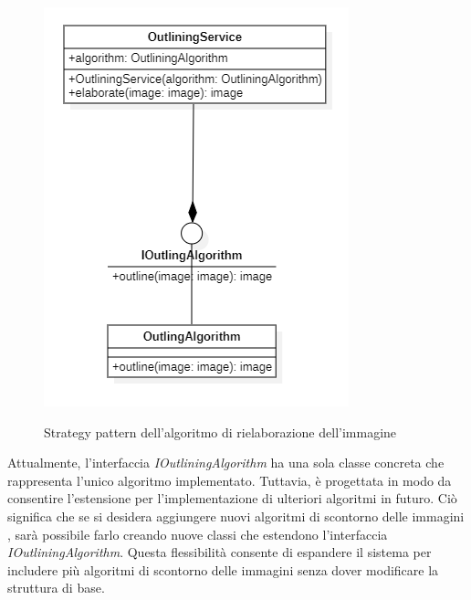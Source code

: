 \begin{figure}[H]
    \centering
    \includegraphics[scale = 0.8]{img/outlineStrategy.png}\\
    \caption{Strategy pattern dell'algoritmo di rielaborazione dell'immagine}
\end{figure}

Attualmente, l'interfaccia \textit{IOutliningAlgorithm} ha una sola classe concreta che rappresenta l'unico algoritmo implementato. Tuttavia, è progettata in modo da consentire l'estensione per l'implementazione di ulteriori 
algoritmi in futuro. Ciò significa che se si desidera aggiungere nuovi algoritmi di scontorno delle immagini , 
sarà possibile farlo creando nuove classi che estendono l'interfaccia \textit{IOutliningAlgorithm}. 
Questa flessibilità consente di espandere il sistema per includere più algoritmi di scontorno delle immagini senza dover 
modificare la struttura di base.

